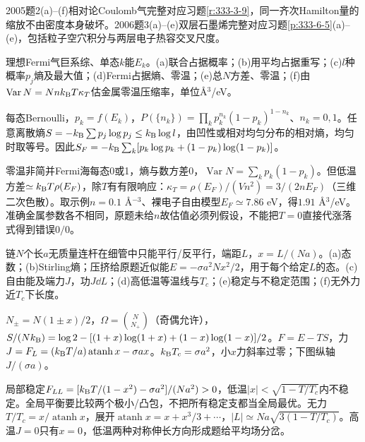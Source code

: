 2005题2(a)--(f)相对论Coulomb气完整对应习题\ref{r:333-3-9}，同一齐次Hamilton量的缩放不由密度本身破坏。2006题3(a)--(e)双层石墨烯完整对应习题\ref{p:333-6-5}(a)--(e)，包括粒子空穴积分与两层电子热容交叉尺度。
\begin{exercise}[2005题3(a)--(f)]\label{f:333-2005-3}
理想Fermi气巨系综、单态$k$能$E_k$。(a)联合占据概率；(b)用平均占据重写；(c)$l$种概率$p_j$熵及最大值；(d)Fermi占据熵、零温；(e)总$N$方差、零温；(f)由$\operatorname{Var}N=Nnk_{\mathrm B} T\kappa_T$估金属零温压缩率，单位Å$^3$/eV。
\end{exercise}
\begin{solution}
每态Bernoulli，$p_k=f(E_k)$，$P(\{n_k\})=\prod_kp_k^{n_k}(1-p_k)^{1-n_k}$、$n_k=0,1$。任意离散熵$S=-k_{\mathrm B}\sum p_j\log p_j\le k_{\mathrm B}\log l$，由凹性或相对均匀分布的相对熵，均匀时取等号。因此$S_F=-k_{\mathrm B}\sum_k[p_k\log p_k+(1-p_k)\log(1-p_k)]$。

零温非简并Fermi海每态0或1，熵与数方差0，$\operatorname{Var}N=\sum_kp_k(1-p_k)$。但低温方差$\simeq k_{\mathrm B} T\rho(E_F)$，除$T$有有限响应：$\kappa_T=\rho(E_F)/(Vn^2)=3/(2nE_F)$（三维二次色散）。取示例$n=0.1$ Å$^{-3}$、裸电子自由模型$E_F\simeq7.86$ eV，得$1.91$ Å$^3$/eV。准确金属参数各不相同，原题未给$n$故估值必须列假设，不能把$T=0$直接代涨落式得到错误$0/0$。
\end{solution}
\begin{exercise}[2006题2(a)--(f)]\label{f:333-2006-2}
链$N$个长$a$无质量连杆在细管中只能平行/反平行，端距$L$，$x=L/(Na)$。(a)态数；(b)Stirling熵；压挤给原题近似能$E=-\sigma a^2Nx^2/2$，用于每个给定$L$的态。(c)自由能及端力$J$，功$J\dd L$；(d)高低温等温线与$T_c$；(e)稳定与不稳定范围；(f)无外力近$T_c$下长度。
\end{exercise}
\begin{solution}
$N_\pm=N(1\pm x)/2$，$\Omega=\binom N{N_+}$（奇偶允许），$S/(Nk_{\mathrm B})=\log2-[(1+x)\log(1+x)+(1-x)\log(1-x)]/2$。$F=E-TS$，力$J=F_L=(k_{\mathrm B} T/a)\operatorname{atanh}x-\sigma ax$。$k_{\mathrm B} T_c=\sigma a^2$，小$x$力斜率过零；下图纵轴$J/(\sigma a)$。
\begin{center}\end{center}
局部稳定$F_{LL}=[k_{\mathrm B} T/(1-x^2)-\sigma a^2]/(Na^2)>0$，低温$|x|<\sqrt{1-T/T_c}$内不稳定。全局平衡要比较两个极小/凸包，不把所有稳定支都当全局最优。无力$T/T_c=x/\operatorname{atanh}x$，展开$\operatorname{atanh}x=x+x^3/3+\cdots$，$|L|\simeq Na\sqrt{3(1-T/T_c)}$。高温$J=0$只有$x=0$，低温两种对称伸长方向形成题给平均场分岔。
\end{solution}
